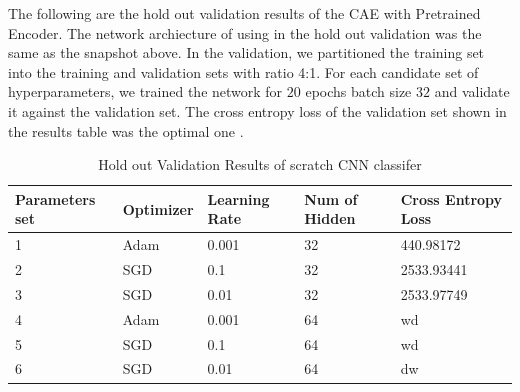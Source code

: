 \documentclass{article}
\begin{document}
The following are the hold out validation results of the CAE with Pretrained Encoder. The network archiecture of using in the hold out validation was the same as the snapshot above. In the validation, we partitioned the training set into the training and validation sets with ratio 4:1. For each candidate set of hyperparameters, we trained the network for $20$ epochs batch size $32$ and validate it against the validation set. The cross entropy loss of the validation set shown in the results table was the optimal one .


\begin{table}[htb]
\caption{Hold out Validation Results of scratch CNN classifer}
	\label{sample-table}
	\centering
\begin{tabular}{lllll}
\toprule
		\cmidrule{1-5}
		Parameters set& Optimizer & Learning Rate & Num of Hidden & Cross Entropy Loss 		\\
		\midrule
 			1 & Adam & 0.001 & 32 & 440.98172 \\
 			2 & SGD & 0.1 & 32 &  2533.93441\\
 			3 & SGD & 0.01 & 32 & 2533.97749 \\
			4 & Adam & 0.001 & 64 & wd \\
 			5 & SGD & 0.1 & 64 &  wd\\
 			6 & SGD & 0.01 & 64 & dw \\
\bottomrule
\end{tabular}
\end{table}
\end{document}
